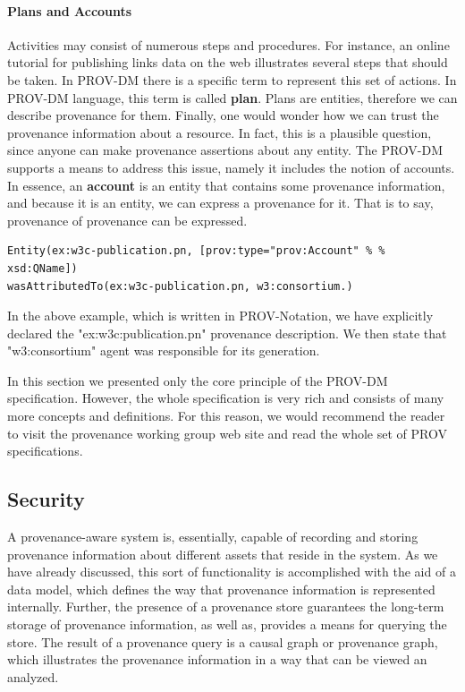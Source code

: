 \paragraph{Plans and Accounts}

Activities may consist of numerous steps and procedures. For instance, an online tutorial for publishing links data on the web illustrates several steps that should be taken. In PROV-DM there is a specific term to represent this set of actions. In PROV-DM language, this term is called \textbf{plan}. Plans are entities, therefore we can describe provenance for them.
Finally, one would wonder how we can trust the provenance information about a resource. In fact, this is a plausible question, since anyone can make provenance assertions about any entity. The PROV-DM supports a means to address this issue, namely it includes the notion of accounts. In essence, an \textbf{account} is an entity that contains some provenance information, and because it is an entity, we can express a provenance for it. That is to say, provenance of provenance can be expressed.

\begin{verbatim}
Entity(ex:w3c-publication.pn, [prov:type="prov:Account" % % xsd:QName])
wasAttributedTo(ex:w3c-publication.pn, w3:consortium.)
\end{verbatim}

In the above example, which is written in PROV-Notation, we have explicitly declared the "ex:w3c:publication.pn" provenance description. We then state that "w3:consortium" agent was responsible for its generation.

In this section we presented only the core principle of the PROV-DM specification. However, the whole specification is very rich and consists of many more concepts and definitions. For this reason, we would recommend the reader to visit the provenance working group web site and read the whole set of PROV specifications.

\subsection{Security}

A provenance-aware system is, essentially, capable of recording and storing provenance information about different assets that reside in the system. As we have already discussed, this sort of functionality is accomplished with the aid of a data model, which defines the way that provenance information is represented internally. Further, the presence of a provenance store guarantees the long-term storage of provenance information, as well as, provides a means for querying the store\cite{reference19:5}. The result of a provenance query is a causal graph or provenance graph, which illustrates the provenance information in a way that can be viewed an analyzed.

